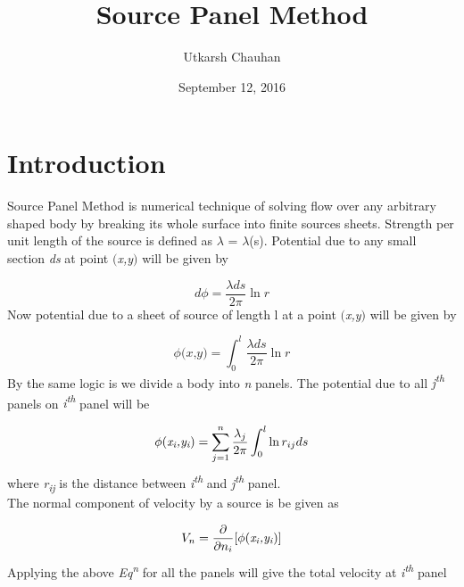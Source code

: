 \documentclass[a4paper]{article}
\title{\bf{Source Panel Method}}
\author{Utkarsh Chauhan}
\date{September 12, 2016}
\begin{document}
\maketitle

\section{Introduction}
\label{sec:introduction}

Source Panel Method is numerical technique of solving flow over any arbitrary shaped body by breaking its whole surface into finite sources sheets. Strength per unit length of the source is defined as {$\lambda$ = $\lambda$(s)}. Potential due to any small section \textit{ds} at point \textit{$($x,y$)$} will be given by

\begin{equation*}
    d\phi = \frac{\lambda ds}{2 \pi}\ln r
\end{equation*}
\newline
Now potential due to a sheet of source of length l at a point \textit{$($x,y$)$} will be given by

\begin{equation*}
    \phi \textit{$($x,y$)$} = \int_0^l\frac{\lambda ds}{2 \pi}\ln r
\end{equation*}
\newline
By the same logic is we divide a body into \textit{n} panels. The potential due to all \textit{j\textsuperscript{th}} panels on \textit{i\textsuperscript{th}} panel will be 

\begin{equation*}
    \phi \textit{$($x\textsubscript{i},y\textsubscript{i}$)$} = \sum_{j=1}^{n} \frac{\lambda_j}{2 \pi} \int_0^l\ln r_{ij} ds
\end{equation*}
\newline
where \textit{r\textsubscript{ij}} is the distance between \textit{i\textsuperscript{th}} and \textit{j\textsuperscript{th}} panel.\\
\newline
The normal component of velocity by a source is be given as 

\begin{equation*}
V_n = \frac{\partial }{\partial n_i}[\phi \textit{$($x\textsubscript{i},y\textsubscript{i}$)$}]
\end{equation*}
\newline
Applying the above \textit{Eq\textsuperscript{n}} for all the panels will give the total velocity at \textit{i\textsuperscript{th}} panel 
\end{document}
